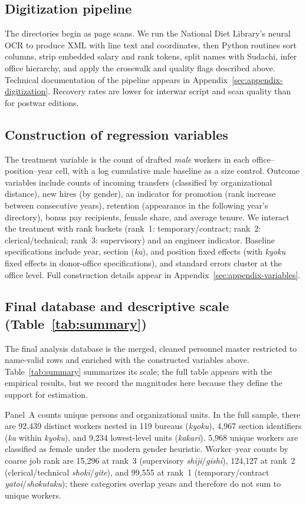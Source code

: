 \subsection{Digitization pipeline}

The directories begin as page scans. We run the National Diet Library's neural OCR to produce XML with line text and coordinates, then Python routines sort columns, strip embedded salary and rank tokens, split names with Sudachi, infer office hierarchy, and apply the crosswalk and quality flags described above. Technical documentation of the pipeline appears in Appendix~\ref{sec:appendix-digitization}. Recovery rates are lower for interwar script and scan quality than for postwar editions.

\subsection{Construction of regression variables}

The treatment variable is the count of drafted \emph{male} workers in each office--position--year cell, with a log cumulative male baseline as a size control. Outcome variables include counts of incoming transfers (classified by organizational distance), new hires (by gender), an indicator for promotion (rank increase between consecutive years), retention (appearance in the following year's directory), bonus pay recipients, female share, and average tenure. We interact the treatment with rank buckets (rank~1: temporary/contract; rank~2: clerical/technical; rank~3: supervisory) and an engineer indicator. Baseline specifications include year, section (\emph{ka}), and position fixed effects (with \emph{kyoku} fixed effects in donor-office specifications), and standard errors cluster at the office level. Full construction details appear in Appendix~\ref{sec:appendix-variables}.

\subsection{Final database and descriptive scale (Table~\ref{tab:summary})}

The final analysis database is the merged, cleaned personnel master restricted to name-valid rows and enriched with the constructed variables above. Table~\ref{tab:summary} summarizes its scale; the full table appears with the empirical results, but we record the magnitudes here because they define the support for estimation.

Panel~A counts unique persons and organizational units. In the full sample, there are 92{,}439 distinct workers nested in 119 bureaus (\emph{kyoku}), 4{,}967 section identifiers (\emph{ka} within \emph{kyoku}), and 9{,}234 lowest-level units (\emph{kakari}). 5{,}968 unique workers are classified as female under the modern gender heuristic. Worker--year counts by coarse job rank are 15{,}296 at rank~3 (supervisory \emph{shiji}/\emph{gishi}), 124{,}127 at rank~2 (clerical/technical \emph{shoki}/\emph{gite}), and 99{,}555 at rank~1 (temporary/contract \emph{yatoi}/\emph{shokutaku}); these categories overlap years and therefore do not sum to unique workers.

